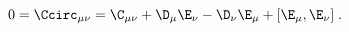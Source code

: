 \begin{equation}
\label{e5:42}
0=\Ccirc_{\mu \nu} = \C_{\mu \nu} + \D_{\mu} \E_{\nu} - \D_{\nu} \E_{\mu} +[\E_{\mu},\E_{\nu}] \; .
\end{equation}

